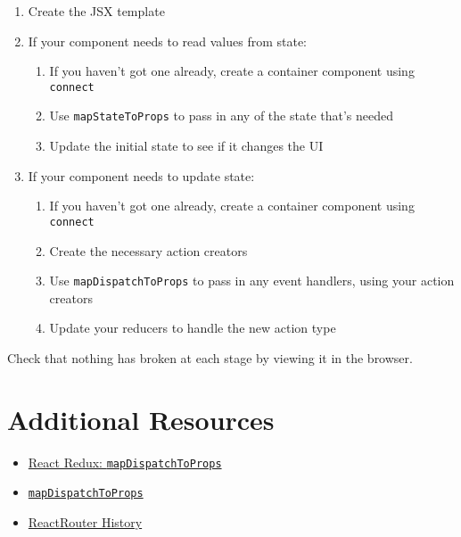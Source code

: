 \begin{enumerate}
    \item Create the JSX template
    \item If your component needs to read values from state:
        \begin{enumerate}
            \item If you haven't got one already, create a container component using \texttt{connect}
            \item Use \texttt{mapStateToProps} to pass in any of the state that's needed
            \item Update the initial state to see if it changes the UI
        \end{enumerate}
    \item If your component needs to update state:
        \begin{enumerate}
            \item If you haven't got one already, create a container component using \texttt{connect}
            \item Create the necessary action creators
            \item Use \texttt{mapDispatchToProps} to pass in any event handlers, using your action creators
            \item Update your reducers to handle the new action type
        \end{enumerate}
\end{enumerate}

Check that nothing has broken at each stage by viewing it in the browser.


\section{Additional Resources}

\begin{itemize}[leftmargin=*]
    \item \href{https://react-redux.js.org/using-react-redux/connect-mapdispatch}{React Redux: \texttt{mapDispatchToProps}}
    \item \href{https://learn.co/lessons/map-dispatch-to-props-readme}{\texttt{mapDispatchToProps}}
    \item \href{https://github.com/ReactTraining/history}{ReactRouter History}
\end{itemize}
